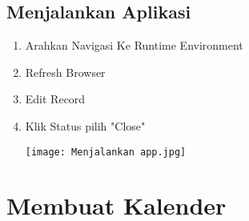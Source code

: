 \documentclass[a4paper,12pt]{report}
\begin{document}
\subsection{Menjalankan Aplikasi}
\begin{enumerate}
    \item Arahkan Navigasi Ke Runtime Environment
    \item Refresh Browser
    \item Edit Record
    \item Klik Status pilih "Close"
     \begin{center}
    \texttt{[image: Menjalankan app.jpg]}
    \end{center}
\end{enumerate}

\section{Membuat Kalender}
\end{document}
